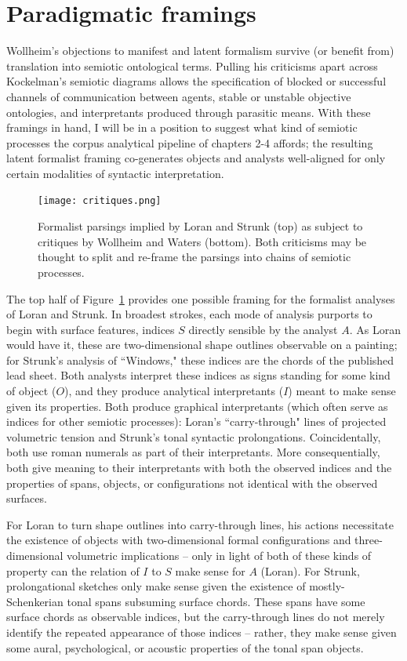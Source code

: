 \section{Paradigmatic framings}
Wollheim's objections to manifest and latent formalism survive (or benefit from) translation into semiotic ontological terms. Pulling his criticisms apart across Kockelman's semiotic diagrams allows the specification of blocked or successful channels of communication between agents, stable or unstable objective ontologies, and interpretants produced through parasitic means.  With these framings in hand, I will be in a position to suggest what kind of semiotic processes the corpus analytical pipeline of chapters 2-4 affords; the resulting latent formalist framing co-generates objects and analysts well-aligned for only certain modalities of syntactic interpretation.

\begin{figure}
	\centering
	\caption{Formalist parsings implied by Loran and Strunk (top) as subject to critiques by Wollheim and Waters (bottom).  Both criticisms may be thought to split and re-frame the parsings into chains of semiotic processes.}
	\label{critiques}
	\texttt{[image: critiques.png]}
\end{figure}

The top half of Figure~\ref{critiques} provides one possible framing for the formalist analyses of Loran and Strunk.  In broadest strokes, each mode of analysis purports to begin with surface features, indices $S$ directly sensible by the analyst $A$.  As Loran would have it, these are two-dimensional shape outlines observable on a painting; for Strunk's analysis of ``Windows," these indices are the chords of the published lead sheet.  Both analysts interpret these indices as signs standing for some kind of object ($O$), and they produce analytical interpretants ($I$) meant to make sense given its properties.  Both produce graphical interpretants (which often serve as indices for other semiotic processes): Loran's ``carry-through" lines of projected volumetric tension and Strunk's tonal syntactic prolongations.  Coincidentally, both use roman numerals as part of their interpretants.  More consequentially, both give meaning to their interpretants with both the observed indices and the properties of spans, objects, or configurations not identical with the observed surfaces.

For Loran to turn shape outlines into carry-through lines, his actions necessitate the existence of objects with two-dimensional formal configurations and three-dimensional volumetric implications -- only in light of both of these kinds of property can the relation of $I$ to $S$ make sense for $A$ (Loran).  For Strunk, prolongational sketches only make sense given the existence of mostly-Schenkerian tonal spans subsuming surface chords.  These spans have some surface chords as observable indices, but the carry-through lines do not merely identify the repeated appearance of those indices -- rather, they make sense given some aural, psychological, or acoustic properties of the tonal span objects.

